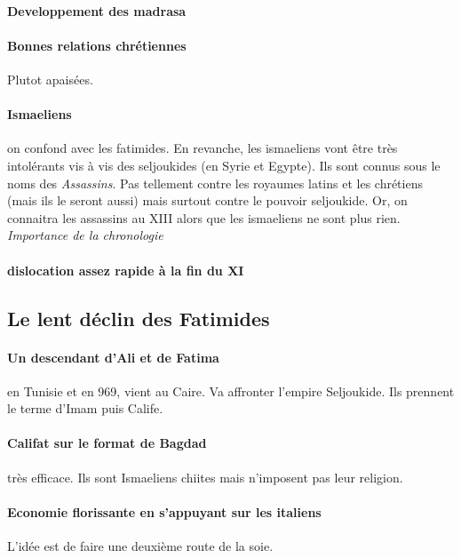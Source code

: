 \paragraph{Developpement des madrasa} 

\paragraph{Bonnes relations chrétiennes} Plutot apaisées.
\paragraph{Ismaeliens}
on confond avec les fatimides.  En revanche, les ismaeliens vont être très intolérants vis à vis des seljoukides (en Syrie et Egypte). Ils sont connus sous le noms des \textit{Assassins}. Pas tellement contre les royaumes latins et les chrétiens (mais ils le seront aussi) mais surtout contre le pouvoir seljoukide. Or, on connaitra les assassins au XIII alors que les ismaeliens ne sont plus rien. \textit{Importance de la chronologie}

\paragraph{dislocation assez rapide à la fin du XI}

\subsection{Le lent déclin des Fatimides}

 \paragraph{Un descendant d'Ali et de Fatima} en Tunisie et en 969, vient au Caire. Va affronter l'empire Seljoukide. Ils prennent le terme d'Imam puis Calife.

 \paragraph{Califat sur le format de Bagdad} très efficace. Ils sont Ismaeliens chiites mais n'imposent pas leur religion.  

\paragraph{Economie florissante en s'appuyant sur les italiens} L'idée est de faire une deuxième route de la soie.


